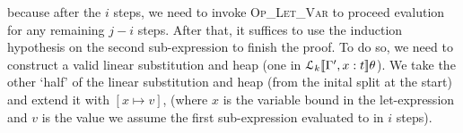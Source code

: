 because after the $i$ steps, we need to invoke \textsc{Op\_Let\_Var} to proceed
evalution for any remaining $j-i$ steps. After that, it suffices to use the
induction hypothesis on the second sub-expression to finish the proof.  To do
so, we need to construct a valid linear substitution and heap (one in
$\mathcal{L}_{k} [\![ \Gamma', x : t ]\!]\theta$). We take the other `half' of the linear
substitution and heap (from the inital split at the start) and extend it with
$[x \mapsto v]$, (where $x$ is the variable bound in the let-expression and $v$
is the value we assume the first sub-expression evaluated to in $i$ steps).

